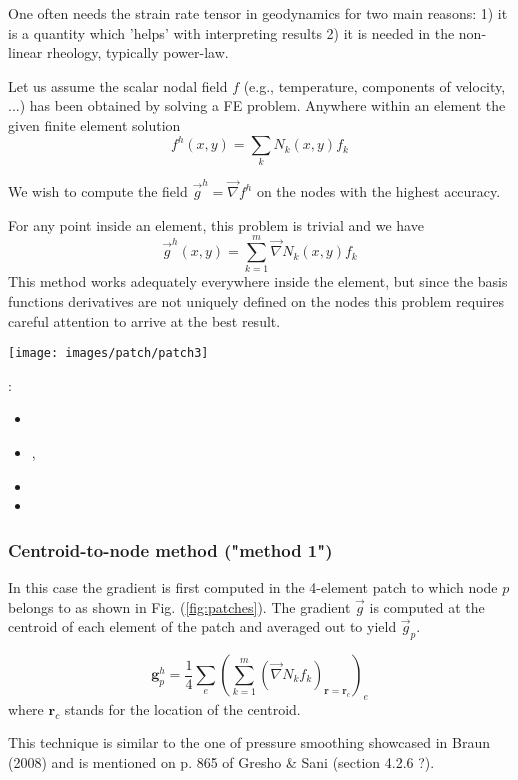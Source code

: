 
One often needs the strain rate tensor in geodynamics for two main reasons:
1) it is a quantity which 'helps' with interpreting results
2) it is needed in the non-linear rheology, typically power-law.

Let us assume the scalar nodal field $f$ (e.g., temperature, 
components of velocity, ...) has been obtained by solving a FE problem.
Anywhere within an element 
the given finite element solution 
\[
f^h(x,y)=\sum_k N_k(x,y) f_k
\]
 
We wish to compute the field $\vec g^h = \vec \nabla f^h$ on the nodes 
with the highest accuracy. 

For any point inside an element, this problem is trivial and we have 
\begin{equation}
\vec g^h(x,y) = \sum_{k=1}^m \vec\nabla N_k (x,y) f_k \label{eq:derr1}
\end{equation}
This method works adequately everywhere inside the element, but 
since the basis functions derivatives
are not uniquely defined on the nodes 
this problem requires careful attention
to arrive at the best result.

\begin{center}
\texttt{[image: images/patch/patch3]}
\end{center}

\Literature: 
\begin{itemize}
\item {}
\item {},
\item {}
\item {}
\end{itemize}

\subsubsection{Centroid-to-node method ("method 1")}
In this case the gradient is first computed in the 4-element patch 
to which node $p$ belongs to as shown in Fig. (\ref{fig:patches}).
The gradient $\vec g$ is computed at the centroid of each element of the 
patch and averaged out to yield $\vec g_p$.

\[
\bm g_p^h = \frac{1}{4} \sum_{e} \left( \sum_{k=1}^m  (\vec\nabla N_k f_k)_{\bm r=\bm r_c} \right)_e
\]
where $\bm r_c$ stands for the location of the centroid. 

This technique is similar to the one of pressure smoothing showcased 
in Braun \etal (2008) \cite{brtf08}
and is mentioned on p. 865 of Gresho \& Sani \cite{grsa} (section 4.2.6 ?).

